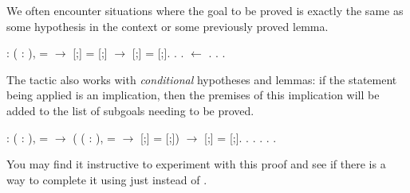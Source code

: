 \documentclass[12pt]{report}
\begin{document}
 We often encounter situations where the goal to be proved is
    exactly the same as some hypothesis in the context or some
    previously proved lemma. \begin{coqdoccode}
\coqdocemptyline
\coqdocnoindent
{}  : \coqdockw{\ensuremath{\forall}} (    : ),\coqdoceol
\coqdocindent{2.50em}
 =   \ensuremath{\rightarrow}\coqdoceol
\coqdocindent{2.50em}
[;] = [;] \ensuremath{\rightarrow}\coqdoceol
\coqdocindent{2.50em}
[;] = [;].\coqdoceol
\coqdocnoindent
{}.\coqdoceol
\coqdocindent{1.00em}
      .\coqdoceol
\coqdocindent{1.00em}
 \ensuremath{\leftarrow} .\coqdoceol
\coqdocindent{1.00em}
 . .\coqdoceol
\coqdocemptyline
\end{coqdoccode}
The  tactic also works with \textit{conditional} hypotheses
    and lemmas: if the statement being applied is an implication, then
    the premises of this implication will be added to the list of
    subgoals needing to be proved. \begin{coqdoccode}
\coqdocemptyline
\coqdocnoindent
{}  : \coqdockw{\ensuremath{\forall}} (    : ),\coqdoceol
\coqdocindent{2.50em}
 =   \ensuremath{\rightarrow}\coqdoceol
\coqdocindent{2.50em}
(\coqdockw{\ensuremath{\forall}} (  : ),  =  \ensuremath{\rightarrow} [;] = [;]) \ensuremath{\rightarrow}\coqdoceol
\coqdocindent{2.50em}
[;] = [;].\coqdoceol
\coqdocnoindent
{}.\coqdoceol
\coqdocindent{1.00em}
      .\coqdoceol
\coqdocindent{1.00em}
 .  . .\coqdoceol
\coqdocemptyline
\end{coqdoccode}
You may find it instructive to experiment with this proof
    and see if there is a way to complete it using just 
    instead of . 
\end{document}
